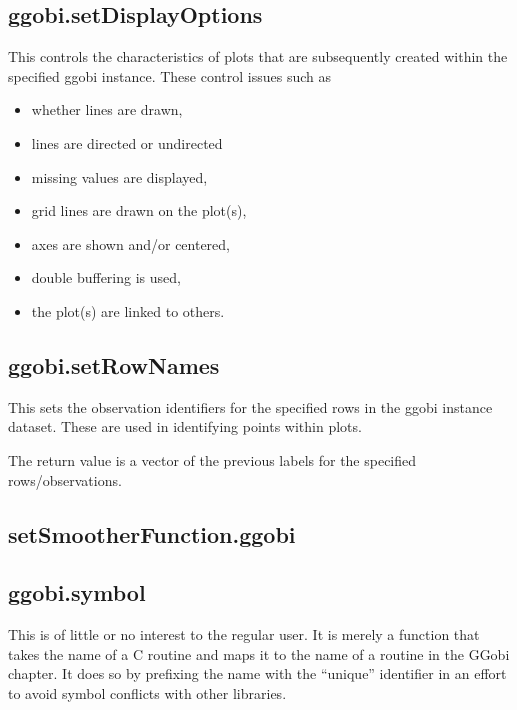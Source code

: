 \documentclass{article}
\begin{document}
\subsection{ggobi.setDisplayOptions}
This controls the characteristics
of plots that are subsequently
created within the specified ggobi instance.
These control issues such as 
\begin{itemize}
\item whether lines are drawn, 
\item lines are directed or undirected
\item missing values are displayed,
\item grid lines are drawn on the plot(s),
\item axes are shown and/or centered,
\item double buffering is used,
\item the plot(s) are linked to others.
\end{itemize}



\subsection{ggobi.setRowNames}
This sets the observation identifiers for the 
specified rows in the ggobi instance dataset.
These are used in identifying points within 
plots.

The return value is a vector of the previous labels for the
specified rows/observations.

\subsection{setSmootherFunction.ggobi}




\subsection{ggobi.symbol}
This is of little or no interest to the regular user.  It is merely a
function that takes the name of a C routine and maps it to the name of
a routine in the GGobi chapter.  It does so by prefixing the name with
the ``unique'' identifier  in an effort to avoid
symbol conflicts with other libraries.
\end{document}
